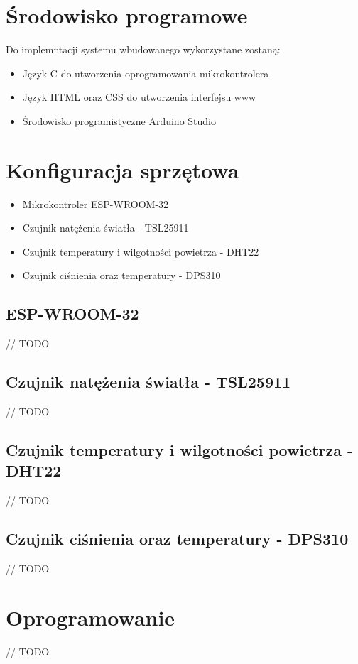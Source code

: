 \documentclass[12pt,a4paper]{article}
\begin{document}
\section{Środowisko programowe}
Do implemntacji systemu wbudowanego wykorzystane zostaną:
\begin{itemize}
    \item Język C do utworzenia oprogramowania mikrokontrolera
    \item Język HTML oraz CSS do utworzenia interfejsu www
    \item Środowisko programistyczne Arduino Studio
\end{itemize}

\section{Konfiguracja sprzętowa}

\begin{itemize}
    \item Mikrokontroler ESP-WROOM-32
    \item Czujnik natężenia światła - TSL25911
    \item Czujnik temperatury i wilgotności powietrza - DHT22
    \item Czujnik ciśnienia oraz temperatury - DPS310
\end{itemize}

\subsection{ESP-WROOM-32}
// TODO

\subsection{Czujnik natężenia światła - TSL25911}
// TODO

\subsection{Czujnik temperatury i wilgotności powietrza - DHT22}
// TODO

\subsection{Czujnik ciśnienia oraz temperatury - DPS310}
// TODO

\section{Oprogramowanie}
// TODO
\end{document}

